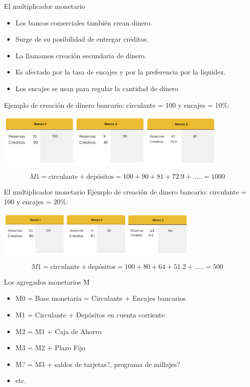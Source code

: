 \documentclass{beamer}
\begin{document}
\begin{frame}{El multiplicador monetario}
    \begin{itemize}
        \item Los bancos comerciales también crean dinero.
        \item Surge de su posibilidad de entregar créditos.
        \item La llamamos creación secundaria de dinero.
        \item Es afectado por la tasa de encajes y por la preferencia por la liquidez.
        \item Los encajes se usan para regular la cantidad de dinero
    \end{itemize}

    Ejemplo de creación de dinero bancario:  circulante = 100  y  encajes = 10\%:

    \centering
    \includegraphics[width=11.5cm]{../Figures/C37.15.png}

    
    \[M1 = \text{circulante} + \text{depósitos} = 100 + 90 + 81 + 72.9 + ..... = 1000 \]

\end{frame}

\begin{frame}{El multiplicador monetario}
    Ejemplo de creación de dinero bancario:  circulante = 100  y  encajes = 20\%:
    
    \centering
    \includegraphics[width=10cm]{../Figures/C37.16.png}
    
    \[M1 = \text{circulante} + \text{depósitos} = 100 + 80 + 64 + 51.2 + ..... = 500 \]
\end{frame}


\begin{frame}{Los agregados monetarios M}
    \begin{itemize}
        \item M0 = Base monetaria = Circulante + Encajes bancarios
        \item M1 = Circulante + Depósitos en cuenta corriente
        \item M2 = M1 + Caja de Ahorro
        \item M3 = M2 + Plazo Fijo
        \item M? = M3 + saldos de tarjetas?, programa de millajes? 
        \item etc.
    \end{itemize}
\end{frame}
\end{document}
